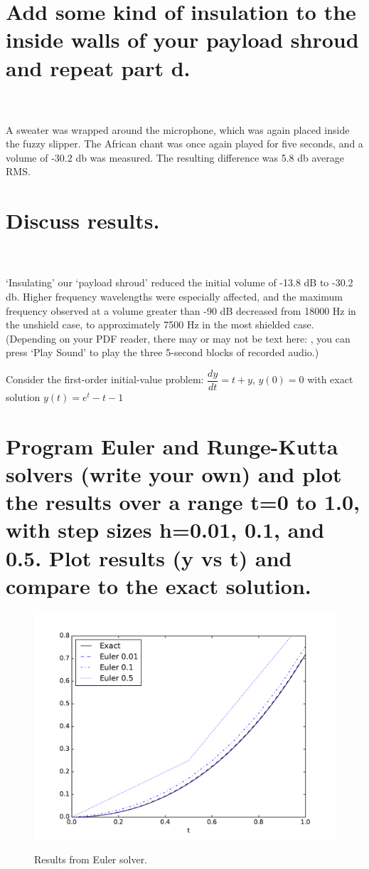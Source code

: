 \documentclass[onecolumn,10pt]{jhwhw}
\begin{document}
\part{Add some kind of insulation to the inside walls of your payload shroud and repeat part d.}
\\
\\
\noindent A sweater was wrapped around the microphone, which was again placed inside the fuzzy slipper. The African chant was once again played for five seconds, and a volume of -30.2 db was measured. The resulting difference was 5.8 db average RMS.

\part{Discuss results.}
\\
\\
\noindent `Insulating' our `payload shroud' reduced the initial volume of -13.8 dB to -30.2 db. Higher frequency wavelengths were especially affected, and the maximum frequency observed at a volume greater than -90 dB decreased from 18000 Hz in the unshield case, to approximately 7500 Hz in the most shielded case. (Depending on your PDF reader, there may or may not be text here: , you can press `Play Sound' to play the three 5-second blocks of recorded audio.)

Consider the first-order initial-value problem:
$\dfrac{dy}{dt} = t + y$, $y(0)=0$ with exact solution $y(t) = e^t-t-1$
\part{Program Euler and Runge-Kutta solvers (write your own) and plot the results over a range t=0 to 1.0, with step sizes h=0.01, 0.1, and 0.5. Plot results (y vs t) and compare to the exact solution.}

\begin{figure}[h!]
\begin{center}
\includegraphics[height=0.5\textheight]{euler.pdf}
\label{fig:on}
\end{center}
\caption{Results from Euler solver.}
\end{figure}
\end{document}
